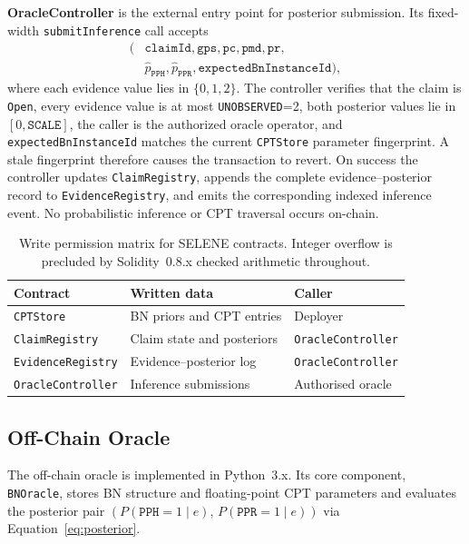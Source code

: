 \documentclass[journal]{IEEEtran}
\theoremstyle{definition}
\theoremstyle{remark}
\begin{document}
\textbf{OracleController} is the external entry point for
posterior submission. Its fixed-width
\texttt{submitInference} call accepts
\begin{align*}
(&\texttt{claimId},
 \texttt{gps},\texttt{pc},\texttt{pmd},\texttt{pr},\\
 &\widehat{p}_{\texttt{PPH}},
 \widehat{p}_{\texttt{PPR}},
 \texttt{expectedBnInstanceId}),
\end{align*}
where each evidence value lies in $\{0,1,2\}$.
The controller verifies that the claim is
\texttt{Open}, every evidence value is at most
\texttt{UNOBSERVED}=2, both posterior values lie in
$[0,\texttt{SCALE}]$, the caller is the authorized oracle
operator, and \texttt{expectedBnInstanceId} matches the
current \texttt{CPTStore} parameter fingerprint.
A stale fingerprint therefore causes the transaction to
revert. On success the controller updates
\texttt{ClaimRegistry}, appends the complete
evidence--posterior record to \texttt{EvidenceRegistry},
and emits the corresponding indexed inference event.
No probabilistic inference or CPT traversal occurs
on-chain.

\begin{table}[t]
\centering
\caption{Write permission matrix for SELENE contracts.
Integer overflow is precluded by Solidity~0.8.x
checked arithmetic throughout.}
\label{tab:access-control}
\begin{tabularx}{\columnwidth}{lXl}
\toprule
\textbf{Contract} &
\textbf{Written data} &
\textbf{Caller} \\
\midrule
\texttt{CPTStore}
  & BN priors and CPT entries
  & Deployer \\
\texttt{ClaimRegistry}
  & Claim state and posteriors
  & \texttt{OracleController} \\
\texttt{EvidenceRegistry}
  & Evidence--posterior log
  & \texttt{OracleController} \\
\texttt{OracleController}
  & Inference submissions
  & Authorised oracle \\
\bottomrule
\end{tabularx}
\end{table}

\subsection{Off-Chain Oracle}

The off-chain oracle is implemented in Python~3.x.
Its core component, \texttt{BNOracle}, stores BN
structure and floating-point CPT parameters and
evaluates the posterior pair
$(P(\texttt{PPH}=1\mid e),\,P(\texttt{PPR}=1\mid e))$
via Equation~\eqref{eq:posterior}.
\end{document}
